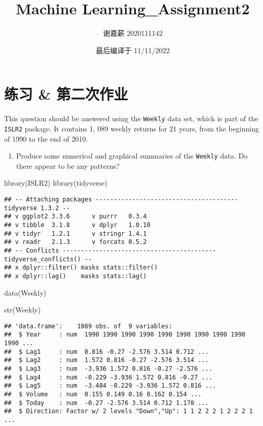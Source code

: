 \documentclass[
]{article}
\title{Machine Learning\_Assignment2}
\author{谢嘉薪 2020111142}
\date{最后编译于 11/11/2022}
\newenvironment{Shaded}{\begin{snugshade}}{\end{snugshade}}
\newcommand{\FunctionTok}[1]{\textcolor[rgb]{0.00,0.00,0.00}{#1}}
\newcommand{\NormalTok}[1]{#1}
\providecommand{\tightlist}{%
  \setlength{\itemsep}{0pt}\setlength{\parskip}{0pt}}
\begin{document}
\maketitle

{
\setcounter{tocdepth}{2}
\tableofcontents
}
\hypertarget{ux7ec3ux4e60-ux7b2cux4e8cux6b21ux4f5cux4e1a}{%
\section{练习 \&
第二次作业}\label{ux7ec3ux4e60-ux7b2cux4e8cux6b21ux4f5cux4e1a}}

This question should be answered using the \texttt{Weekly} data set,
which is part of the \texttt{ISLR2} package. It contains 1, 089 weekly
returns for 21 years, from the beginning of 1990 to the end of 2010.

\begin{enumerate}
\def\labelenumi{\arabic{enumi}.}
\tightlist
\item
  Produce some numerical and graphical summaries of the \texttt{Weekly}
  data. Do there appear to be any patterns?
\end{enumerate}

\begin{Shaded}
\begin{Highlighting}[]
\FunctionTok{library}\NormalTok{(ISLR2)}
\FunctionTok{library}\NormalTok{(tidyverse)}
\end{Highlighting}
\end{Shaded}

\begin{verbatim}
## -- Attaching packages --------------------------------------- tidyverse 1.3.2 --
## v ggplot2 3.3.6      v purrr   0.3.4 
## v tibble  3.1.8      v dplyr   1.0.10
## v tidyr   1.2.1      v stringr 1.4.1 
## v readr   2.1.3      v forcats 0.5.2 
## -- Conflicts ------------------------------------------ tidyverse_conflicts() --
## x dplyr::filter() masks stats::filter()
## x dplyr::lag()    masks stats::lag()
\end{verbatim}

\begin{Shaded}
\begin{Highlighting}[]
\FunctionTok{data}\NormalTok{(Weekly)}

\FunctionTok{str}\NormalTok{(Weekly)}
\end{Highlighting}
\end{Shaded}

\begin{verbatim}
## 'data.frame':    1089 obs. of  9 variables:
##  $ Year     : num  1990 1990 1990 1990 1990 1990 1990 1990 1990 1990 ...
##  $ Lag1     : num  0.816 -0.27 -2.576 3.514 0.712 ...
##  $ Lag2     : num  1.572 0.816 -0.27 -2.576 3.514 ...
##  $ Lag3     : num  -3.936 1.572 0.816 -0.27 -2.576 ...
##  $ Lag4     : num  -0.229 -3.936 1.572 0.816 -0.27 ...
##  $ Lag5     : num  -3.484 -0.229 -3.936 1.572 0.816 ...
##  $ Volume   : num  0.155 0.149 0.16 0.162 0.154 ...
##  $ Today    : num  -0.27 -2.576 3.514 0.712 1.178 ...
##  $ Direction: Factor w/ 2 levels "Down","Up": 1 1 2 2 2 1 2 2 2 1 ...
\end{verbatim}
\end{document}
